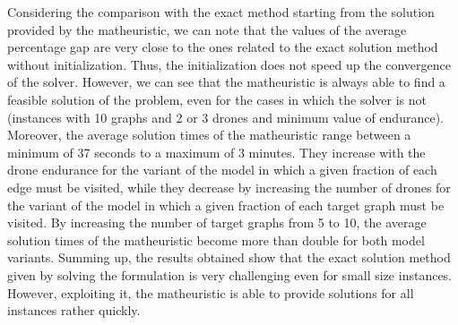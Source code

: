 Considering the comparison with the exact method starting from the solution provided by the matheuristic, we can note that the values of the average percentage gap are very close to the ones related to the exact solution method without initialization. Thus, the initialization does not speed up the convergence of the solver. However, we can see that the matheuristic is always able to find a feasible solution of the problem, even for the cases in which the solver is not (instances with 10 graphs and 2 or 3 drones and minimum value of endurance). 
\noindent
Moreover, the average solution times of the matheuristic range between a minimum of 37 seconds to a maximum of 3 minutes. They increase with the drone endurance for the variant of the model in which a given fraction of each edge must be visited, while they decrease by increasing the number of drones for the variant of the model in which a given fraction of each target graph must be visited. By increasing the number of target graphs from 5 to 10, the average solution times of the matheuristic become more than double for both model variants.
Summing up, the results obtained show that the exact solution method given by solving the formulation is very challenging even for small size instances. However, exploiting it, the matheuristic is able to provide  solutions for all instances rather quickly.


